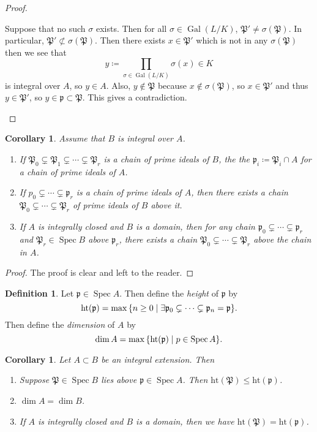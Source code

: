 \documentclass[leqno, openany]{memoir}
\newtheorem{cor}[thm]{Corollary}
\theoremstyle{definition}
\newtheorem{defn}[thm]{Definition}
\theoremstyle{remark}
\theoremstyle{plain}
\theoremstyle{definition}
\theoremstyle{remark}
\newcommand{\mf}[1]{\mathfrak{#1}}
\newcommand{\mr}[1]{\mathrm{#1}}
\DeclareMathOperator{\Gal}{Gal}
\DeclareMathOperator{\spec}{Spec}
\DeclareMathOperator{\Spec}{Spec}
\begin{document}
\begin{proof}
\begin{enumerate}
            Suppose that no such $\sigma$ exists. Then for all $\sigma \in
            \Gal(L/K)$, $\mf{P}' \neq \sigma(\mf{P})$. In particular, $\mf{P}'
            \not\subset \sigma(\mf{P})$. Then there exists $x \in \mf{P}'$
            which is not in any $\sigma(\mf{P})$ then we see that \[ y
            \coloneqq \prod_{\sigma \in \Gal(L/K)} \sigma(x) \in K \] is
            integral over $A$, so $y \in A$. Also, $y \notin \mf{P}$ because $x
            \notin \sigma(\mf{P})$, so $x \in \mf{P}'$ and thus $y \in
            \mf{P}'$, so $y \in \mf{p} \subset \mf{P}$. This gives a
            contradiction. \qedhere \end{enumerate} \end{proof}

\begin{cor} Assume that $B$ is integral over $A$.  \begin{enumerate} \item If
    $\mf{P}_0 \subsetneq \mf{P}_1 \subsetneq \cdots \subsetneq \mf{P}_r$ is a
    chain of prime ideals of $B$, the the $\mf{p}_i \coloneqq \mf{P}_i \cap A$
    for a chain of prime ideals of $A$.  \item If $p_0 \subsetneq \cdots
    \subsetneq \mf{p}_r$ is a chain of prime ideals of $A$, then there exists a
    chain $\mf{P}_0 \subsetneq \cdots \subsetneq \mf{P}_r$ of prime ideals of
    $B$ above it.  \item If $A$ is integrally closed and $B$ is a domain, then
    for any chain $\mf{p}_0 \subsetneq \cdots \subsetneq \mf{p}_r$ and
    $\mf{P}_r \in \Spec B$ above $\mf{p}_r$, there exists a chain $\mf{P}_0
    \subsetneq \cdots \subsetneq \mf{P}_r$ above the chain in $A$.
    \end{enumerate} \end{cor}

\begin{proof} The proof is clear and left to the reader.  \end{proof}

\begin{defn} Let $\mf{p} \in \Spec A$. Then define the \textit{height}  of
    $\mf{p}$ by \[ \mr{ht}(\mf{p}) = \max \qty{n \geq 0 \mid \exists \mf{p}_0
    \subsetneq \cdots \subsetneq \mf{p}_n = \mf{p}}. \] Then define the
    \textit{dimension} of $A$ by \[ \dim A = \max \qty{ \mr{ht}(\mf{p}) \mid p
    \in \Spec A }. \] \end{defn}

\begin{cor} Let $A \subset B$ be an integral extension. Then \begin{enumerate}
    \item Suppose $\mf{P} \in \spec B$ lies above $\mf{p} \in \Spec A$. Then
        $\mr{ht}(\mf{P}) \leq \mr{ht}(\mf{p})$.  \item $\dim A = \dim B$.
    \item If $A$ is integrally closed and $B$ is a domain, then we have
        $\mr{ht}(\mf{P}) = \mr{ht}(\mf{p})$.  \end{enumerate} \end{cor}
\end{document}
